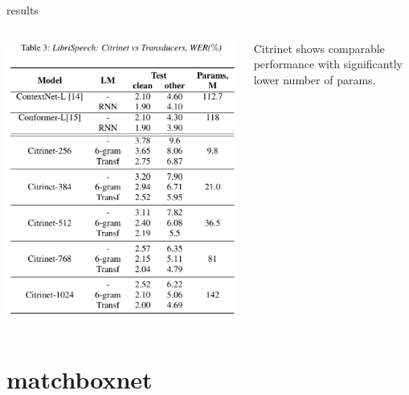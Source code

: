 \documentclass[aspectratio=169,xcolor={dvipsnames,svgnames}]{beamer}
\begin{document}
\begin{frame}[label={sec:orgf9dd878}]{results}
\begin{columns}
\begin{column}{.4\columnwidth}
\begin{center}
\includegraphics[width=.9\linewidth]{org-download-images/citrinet/2024-11-19_10-44-03_screenshot.png}
\end{center}
\end{column}

\begin{column}{.6\columnwidth}
Citrinet shows comparable performance with
significantly lower number of params.
\end{column}
\end{columns}
\end{frame}

\section{matchboxnet}
\label{sec:orgd2a5694}
\end{document}
